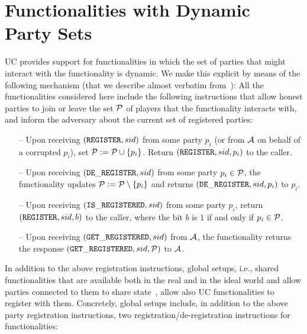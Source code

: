 \section{Functionalities with Dynamic Party Sets}\label{se:registration}
UC provides support for functionalities in which the set of parties that might interact with the functionality is dynamic. We make this explicit by means of the following mechanism (that we describe almost 
verbatim from~\cite[Sec. 3.1]{C:BMTZ17}): All the functionalities considered here include the following instructions that allow honest parties to join or leave the set $\mathcal{P}$ of players that the functionality interacts with, and inform the adversary about the current set of registered parties:

\begin{itemize}
\item[--]  Upon receiving $(\mathtt{REGISTER}, sid)$ from some party $p_i$ (or from $\mathcal{A}$ on behalf of a corrupted $p_i$), set $\mathcal{P} := \mathcal{P} \cup \{p_i\}$. Return $(\mathtt{REGISTER}, sid, p_i)$ to the caller.

\item[--]  Upon receiving $(\mathtt{DE\_REGISTER},sid)$ from some party $p_i\in\mathcal{P}$, the functionality updates 
$\mathcal{P} :=\mathcal{P} \setminus \{p_i\}$ and returns $(\mathtt{DE\_REGISTER}, sid, p_i)$ to $p_i$.
\item[--] Upon receiving $(\mathtt{IS\_REGISTERED}, sid)$ from some party $p_i$, return $(\mathtt{REGISTER},\allowbreak sid, b)$ to the caller, where the bit $b$ is $1$ if and only if $p_i\in\mathcal{P}$.
\item[--] Upon receiving $(\mathtt{GET\_REGISTERED},sid)$ from $\mathcal{A}$, the functionality returns the response 
$(\mathtt{GET\_REGISTERED}, \allowbreak sid, \mathcal{P})$ to $\mathcal{A}$.
\end{itemize}

In addition to the above registration instructions, global setups, i.e., shared functionalities that are available both in the real and in the ideal world and allow parties connected to them to share state~\cite{TCC:CDPW07}, allow also UC functionalities to register with them. Concretely, global setups include, in addition to
 the above party registration instructions, two registration/de-registration instructions for functionalities:

